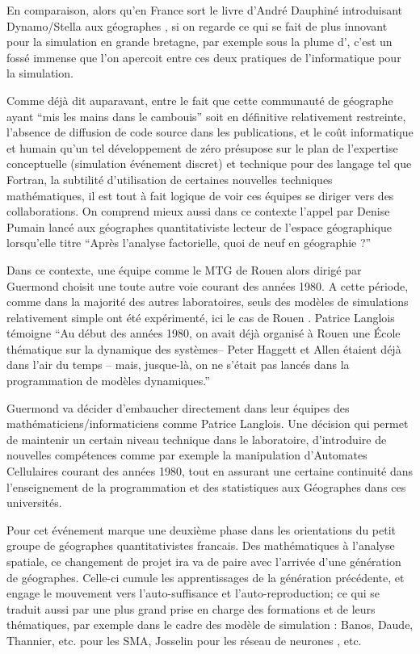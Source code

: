 En comparaison, alors qu'en France sort le livre d'André Dauphiné introduisant Dynamo/Stella aux géographes \autocite{Dauphine1987}, si on regarde ce qui se fait de plus innovant pour la simulation en grande bretagne, par exemple sous la plume d'\textcites{Openshaw1983, Openshaw1988, Openshaw2000}, c'est un fossé immense que l'on apercoit entre ces deux pratiques de l'informatique pour la simulation.

Comme déjà dit auparavant, entre le fait que cette communauté de géographe ayant \enquote{mis les mains dans le cambouis} soit en définitive relativement restreinte, l'absence de diffusion de code source dans les publications, et le coût informatique et humain qu'un tel développement de zéro présupose sur le plan de l'expertise conceptuelle (simulation événement discret) et technique pour des langage tel que Fortran, la subtilité d'utilisation de certaines nouvelles techniques mathématiques, il est tout à fait logique de voir ces équipes se diriger vers des collaborations. On comprend mieux aussi dans ce contexte l'appel par Denise Pumain lancé aux géographes quantitativiste lecteur de l'espace géographique lorsqu'elle titre  \enquote{Après l'analyse factorielle, quoi de neuf en géographie ?} \autocite{Pumain1984}

Dans ce contexte, une équipe comme le MTG de Rouen alors dirigé par Guermond choisit une toute autre voie courant des années 1980. A cette période, comme dans la majorité des autres laboratoires, seuls des modèles de simulations relativement simple ont été expérimenté, ici le cas de Rouen \autocite{Guermond1983}. Patrice Langlois témoigne \enquote{Au début des années 1980, on avait déjà organisé à Rouen une École thématique sur la dynamique des systèmes– Peter Haggett et Allen étaient déjà dans l’air du temps – mais, jusque-là, on ne s’était pas lancés dans la programmation de modèles dynamiques.} \autocite{Mathieu2014} 

Guermond va décider d'embaucher directement dans leur équipes des mathématiciens/informaticiens comme Patrice Langlois. Une décision qui permet de maintenir un certain niveau technique dans le laboratoire, d’introduire de nouvelles compétences comme par exemple la manipulation d'Automates Cellulaires courant des années 1980, tout en assurant une certaine continuité dans l’enseignement de la programmation et des statistiques aux Géographes dans ces universités.

Pour \autocite[320-321]{Cuyala2014} cet événement marque une deuxième phase dans les orientations du petit groupe de géographes quantitativistes francais. Des mathématiques à l'analyse spatiale, ce changement de projet ira va de paire avec l'arrivée d'une génération de géographes. Celle-ci cumule les apprentissages de la génération précédente, et engage le mouvement vers l'auto-suffisance et l'auto-reproduction; ce qui se traduit aussi par une plus grand prise en charge des formations et de leurs thématiques, par exemple dans le cadre des modèle de simulation : Banos, Daude, Thannier, etc. pour les SMA, Josselin pour les réseau de neurones \autocite{Dumolard1994}, etc.

